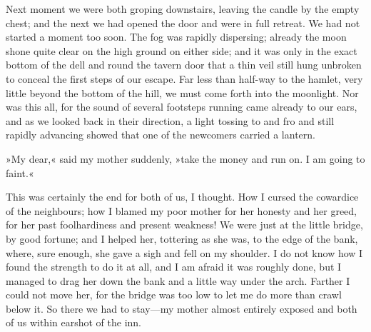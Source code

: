 Next moment we were both groping downstairs, leaving the candle by the empty chest; and the next we had opened the door and were in full retreat. We had not started a moment too soon. The fog was rapidly dispersing; already the moon shone quite clear on the high ground on either side; and it was only in the exact bottom of the dell and round the tavern door that a thin veil still hung unbroken to conceal the first steps of our escape. Far less than half-way to the hamlet, very little beyond the bottom of the hill, we must come forth into the moonlight. Nor was this all, for the sound of several footsteps running came already to our ears, and as we looked back in their direction, a light tossing to and fro and still rapidly advancing showed that one of the newcomers carried a lantern.

»My dear,« said my mother suddenly, »take the money and run on. I am going to faint.«

This was certainly the end for both of us, I thought. How I cursed the cowardice of the neighbours; how I blamed my poor mother for her honesty and her greed, for her past foolhardiness and present weakness! We were just at the little bridge, by good fortune; and I helped her, tottering as she was, to the edge of the bank, where, sure enough, she gave a sigh and fell on my shoulder. I do not know how I found the strength to do it at all, and I am afraid it was roughly done, but I managed to drag her down the bank and a little way under the arch. Farther I could not move her, for the bridge was too low to let me do more than crawl below it. So there we had to stay—my mother almost entirely exposed and both of us within earshot of the inn.
